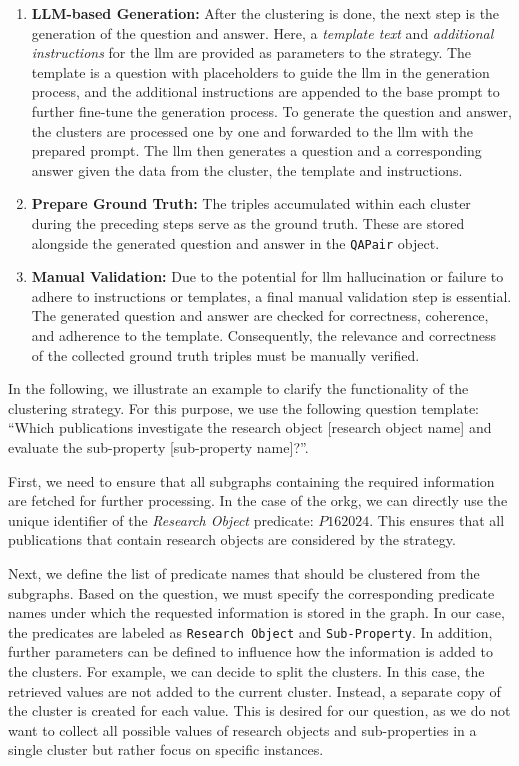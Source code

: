 \begin{enumerate}
    \item \textbf{LLM-based Generation:} After the clustering is done, the next step is the generation of the question and answer. Here, a \emph{template text} and \emph{additional instructions} for the \gls{llm} are provided as parameters to the strategy. The template is a question with placeholders to guide the \gls{llm} in the generation process, and the additional instructions are appended to the base prompt to further fine-tune the generation process. To generate the question and answer, the clusters are processed one by one and forwarded to the \gls{llm} with the prepared prompt. The \gls{llm} then generates a question and a corresponding answer given the data from the cluster, the template and instructions.
    
    \item \textbf{Prepare Ground Truth:} The triples accumulated within each cluster during the preceding steps serve as the ground truth. These are stored alongside the generated question and answer in the \texttt{QAPair} object.
    
    \item \textbf{Manual Validation:} Due to the potential for \gls{llm} hallucination or failure to adhere to instructions or templates, a final manual validation step is essential. The generated question and answer are checked for correctness, coherence, and adherence to the template. Consequently, the relevance and correctness of the collected ground truth triples must be manually verified.
    
\end{enumerate}

In the following, we illustrate an example to clarify the functionality of the clustering strategy. For this purpose, we use the following question template: \enquote{Which publications investigate the research object [research object name] and evaluate the sub-property [sub-property name]?}.

First, we need to ensure that all subgraphs containing the required information are fetched for further processing. In the case of the \gls{orkg}, we can directly use the unique identifier of the \emph{Research Object} predicate: $P162024$. This ensures that all publications that contain research objects are considered by the strategy.

Next, we define the list of predicate names that should be clustered from the subgraphs. Based on the question, we must specify the corresponding predicate names under which the requested information is stored in the graph. In our case, the predicates are labeled as \texttt{Research Object} and \texttt{Sub-Property}. In addition, further parameters can be defined to influence how the information is added to the clusters. For example, we can decide to split the clusters. In this case, the retrieved values are not added to the current cluster. Instead, a separate copy of the cluster is created for each value. This is desired for our question, as we do not want to collect all possible values of research objects and sub-properties in a single cluster but rather focus on specific instances.

